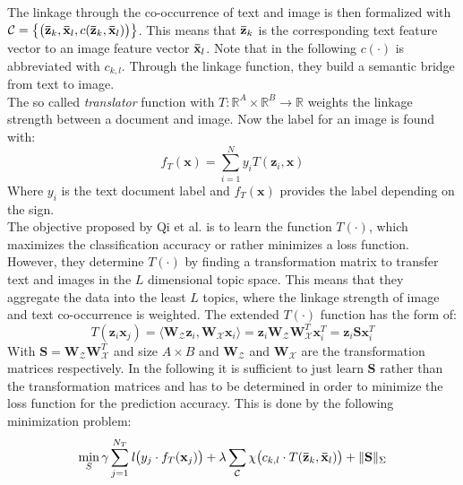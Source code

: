The linkage through the co-occurrence of text and image is then formalized with $\mathcal{C} = \big\{\big( \mathbf{\bar{z}}_k,\mathbf{\bar{x}}_l,c( \mathbf{\bar{z}}_k,\mathbf{\bar{x}}_l) \big)\big\}$.
This means that $\mathbf{\bar{z}}_k$ is the corresponding text feature vector to an image feature vector $\mathbf{\bar{x}}_l$.
Note that in the following $c(\cdot)$ is abbreviated with $c_{k,l}$.
Through the linkage function, they build a semantic bridge from text to image.\cite{Qi.2011}\\
The so called \textit{translator} function with $T : \mathbb{R}^A \times \mathbb{R}^B \to \mathbb{R}$ weights the linkage strength between a document and image.
Now the label for an image is found with:\cite{Qi.2011}
\begin{equation}
	f_T (\mathbf{x}) = \sum_{i=1}^{N} y_i T(\mathbf{z}_i,\mathbf{x})
\end{equation}
Where $y_i$ is the text document label and     $f_T (\mathbf{x})$ provides the label depending on the sign.\\
The objective proposed by Qi et al. is to learn the function $T(\cdot)$, which maximizes the classification accuracy or rather minimizes a loss function. However, they determine $T(\cdot)$ by finding a transformation matrix to transfer text and images in the $L$ dimensional topic space. This means that they aggregate the data into the least $L$ topics, where the linkage strength of image and text co-occurrence is weighted. The extended $T(\cdot)$ function has the form of:\cite{Qi.2011}
\begin{equation}
T(\mathbf{z}_i\mathbf{x}_j) = \langle \mathbf{W}_\mathcal{Z}\mathbf{z}_i,\mathbf{W}_\mathcal{X}\mathbf{x}_i\rangle = \mathbf{z}_i \mathbf{W}_\mathcal{Z}\mathbf{W}_\mathcal{X}^T\mathbf{x}_i^T = \mathbf{z}_i\mathbf{S}\mathbf{x}_i^T 
\end{equation}
With $\mathbf{S} = \mathbf{W}_\mathcal{Z}\mathbf{W}_\mathcal{X}^T$ and size $A \times B$ and $\mathbf{W}_\mathcal{Z}$ and $\mathbf{W}_\mathcal{X}$ are the transformation matrices respectively.
In the following it is sufficient to just learn $\mathbf{S}$ rather than the transformation matrices and has to be determined in order to minimize the loss function for the prediction accuracy. This is done by the following minimization problem:
\begin{equation}\label{EqTTIGeneralOpt}
\min_{S} \gamma \sum_{j=1}^{N_T}\mathit{l}\big( y_j \cdot f_T(\mathbf{x}_j) \big) + \lambda \sum_{\mathcal{C}}  \chi \big( c_{k,l} \cdot T(\mathbf{\bar{z}}_k,\mathbf{\bar{x}}_l)\big) + \Vert \mathbf{S}\Vert_\Sigma
\end{equation}
